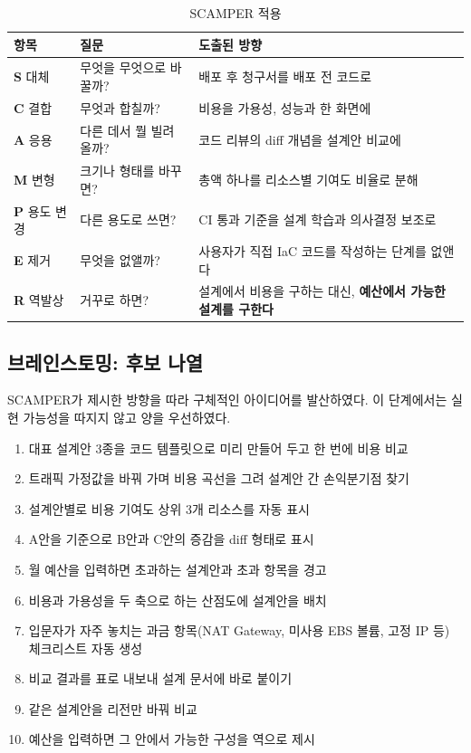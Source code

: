 \documentclass[10pt,a4paper]{article}
\begin{document}
\begin{table}[!h]
\centering
\caption{SCAMPER 적용}
\label{tab:scamper}
\footnotesize
\begin{tabularx}{\textwidth}{l Y Y}
\toprule
\textbf{항목} & \textbf{질문} & \textbf{도출된 방향} \\
\midrule
\textbf{S} 대체     & 무엇을 무엇으로 바꿀까? & 배포 후 청구서를 배포 전 코드로 \\
\textbf{C} 결합     & 무엇과 합칠까? & 비용을 가용성, 성능과 한 화면에 \\
\textbf{A} 응용     & 다른 데서 뭘 빌려올까? & 코드 리뷰의 diff 개념을 설계안 비교에 \\
\textbf{M} 변형     & 크기나 형태를 바꾸면? & 총액 하나를 리소스별 기여도 비율로 분해 \\
\textbf{P} 용도 변경 & 다른 용도로 쓰면? & CI 통과 기준을 설계 학습과 의사결정 보조로 \\
\textbf{E} 제거     & 무엇을 없앨까? & 사용자가 직접 IaC 코드를 작성하는 단계를 없앤다 \\
\textbf{R} 역발상   & 거꾸로 하면? & 설계에서 비용을 구하는 대신, \textbf{예산에서 가능한 설계를 구한다} \\
\bottomrule
\end{tabularx}
\end{table}

\subsection{브레인스토밍: 후보 나열}

SCAMPER가 제시한 방향을 따라 구체적인 아이디어를 발산하였다. 이 단계에서는 실현 가능성을 따지지 않고 양을 우선하였다.

\begin{enumerate}[itemsep=1pt, topsep=4pt]
\item 대표 설계안 3종을 코드 템플릿으로 미리 만들어 두고 한 번에 비용 비교
\item 트래픽 가정값을 바꿔 가며 비용 곡선을 그려 설계안 간 손익분기점 찾기
\item 설계안별로 비용 기여도 상위 3개 리소스를 자동 표시
\item A안을 기준으로 B안과 C안의 증감을 diff 형태로 표시
\item 월 예산을 입력하면 초과하는 설계안과 초과 항목을 경고
\item 비용과 가용성을 두 축으로 하는 산점도에 설계안을 배치
\item 입문자가 자주 놓치는 과금 항목(NAT Gateway, 미사용 EBS 볼륨, 고정 IP 등) 체크리스트 자동 생성
\item 비교 결과를 표로 내보내 설계 문서에 바로 붙이기
\item 같은 설계안을 리전만 바꿔 비교
\item 예산을 입력하면 그 안에서 가능한 구성을 역으로 제시
\end{enumerate}
\end{document}
